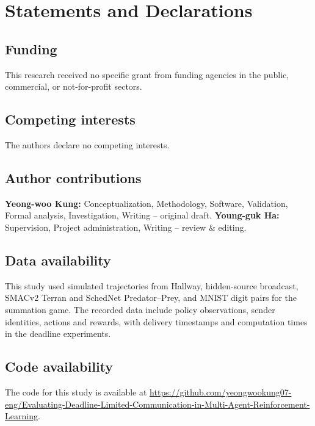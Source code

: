 \documentclass[11pt,a4paper]{article}
\begin{document}
\section*{Statements and Declarations}

\subsection*{Funding}
This research received no specific grant from funding agencies in the public, commercial, or not-for-profit sectors.

\subsection*{Competing interests}
The authors declare no competing interests.

\subsection*{Author contributions}
\textbf{Yeong-woo Kung:} Conceptualization, Methodology, Software, Validation, Formal analysis, Investigation, Writing -- original draft. \textbf{Young-guk Ha:} Supervision, Project administration, Writing -- review \& editing.

\subsection*{Data availability}
This study used simulated trajectories from Hallway, hidden-source broadcast, SMACv2 Terran and SchedNet Predator--Prey, and MNIST digit pairs for the summation game. The recorded data include policy observations, sender identities, actions and rewards, with delivery timestamps and computation times in the deadline experiments.

\subsection*{Code availability}
The code for this study is available at \url{https://github.com/yeongwookung07-eng/Evaluating-Deadline-Limited-Communication-in-Multi-Agent-Reinforcement-Learning}.
\end{document}
